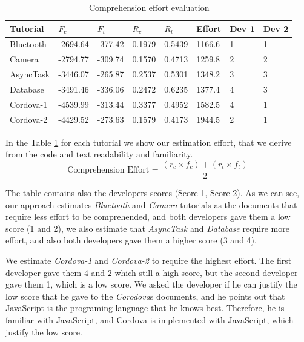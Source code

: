 \documentclass[12pt,mscthesis]{usiinfthesis}
\begin{document}
{\begin {table}[H]
	\begin{center}
    \begin{tabular}{| l | l | l | l | l | l | l | l |}
    \hline
\textbf{Tutorial}	&  \textbf{$F_{c}$}	& \textbf{$F_{t}$}	& \textbf{$R_c$}	& \textbf{$R_t$}	& \textbf{Effort}	& \textbf{ Dev 1}&  \textbf{Dev 2}\\ \hline
Bluetooth   & -2694.64	& -377.42	& 0.1979 	& 0.5439	& 1166.6	& 1	& 1\\ \hline
Camera		& -2794.77	& -309.74	& 0.1570	& 0.4713	& 1259.8	& 2	& 2\\ \hline
AsyncTask	& -3446.07	& -265.87	& 0.2537	& 0.5301	& 1348.2	& 3	& 3\\ \hline
Database	& -3491.46	& -336.06	& 0.2472	& 0.6235	& 1377.4	& 4	& 3\\ \hline
Cordova-1	& -4539.99	& -313.44	& 0.3377	& 0.4952	& 1582.5	& 4	& 1\\ \hline
Cordova-2	& -4429.52	& -273.63	& 0.1579	& 0.4173	& 1944.5	& 2	& 1\\ \hline
   \end{tabular}
	\end{center}
	\caption{Comprehension effort evaluation} \label{tab:comprehension-effort} 
	\end{table}

In the Table \ref{tab:comprehension-effort} for each tutorial we show our estimation effort, that we derive from the code and text readability and familiarity.
\[\text{Comprehension Effort = }\frac{(r_{c}\times f_{c}) + (r_{t} \times f_{t})}{2} \]

The table contains also the developers scores (Score 1, Score 2). As we can see, our approach estimates \emph{Bluetooth} and \emph{Camera} tutorials as the documents that require less effort to be comprehended, and both developers gave them a low score (1 and 2), we also estimate that \emph{AsyncTask} and \emph{Database} require more effort, and also both developers gave them a higher score (3 and 4).

We estimate \emph{Cordova-1} and \emph{Cordova-2} to require the highest effort. The first developer gave them 4 and 2 which still a high score, but the second developer gave them 1, which is a low score. We asked the developer if he can justify the low score that he gave to the \emph{Corodova}s documents, and he points out that JavaScript is the programing language that he knows best. Therefore, he is familiar with JavaScript, and Cordova is implemented with JavaScript, which justify the low score.


}
\end{document}
